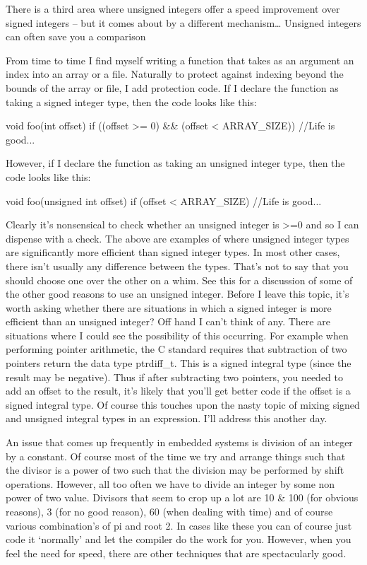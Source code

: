 {{{{{{{{{{There is a third area where unsigned integers offer a speed improvement over signed integers – but it comes about by a different mechanism…
Unsigned integers can often save you a comparison

From time to time I find myself writing a function that takes as an argument an index into an array or a file. Naturally to protect against indexing beyond the bounds of the array or file, I add protection code. If I declare the function as taking a signed integer type, then the code looks like this:

void foo(int offset)
{
 if ((offset >= 0) && (offset < ARRAY_SIZE))
 {
  //Life is good...
 }
}

However, if I declare the function as taking an unsigned integer type, then the code looks like this:

void foo(unsigned int offset)
{
 if (offset < ARRAY_SIZE)
 {
  //Life is good...
 }
}

Clearly it’s nonsensical to check whether an unsigned integer is >=0 and so I can dispense with a check. The above are examples of where unsigned integer types are significantly more efficient than signed integer types. In most other cases, there isn’t usually any difference between the types. That’s not to say that you should choose one over the other on a whim. See this for a discussion of some of the other good reasons to use an unsigned integer. Before I leave this topic, it’s worth asking whether there are situations in which a signed integer is more efficient than an unsigned integer? Off hand I can’t think of any. There are situations where I could see the possibility of this occurring. For example when performing pointer arithmetic, the C standard requires that subtraction of two pointers return the data type ptrdiff_t. This is a signed integral type (since the result may be negative). Thus if after subtracting two pointers, you needed to add an offset to the result, it’s likely that you’ll get better code if the offset is a signed integral type. Of course this touches upon the nasty topic of mixing signed and unsigned integral types in an expression. I’ll address this another day.



An issue that comes up frequently in embedded systems is division of an integer by a constant. Of course most of the time we try and arrange things such that the divisor is a power of two such that the division may be performed by shift operations. However, all too often we have to divide an integer by some non power of two value. Divisors that seem to crop up a lot are 10 & 100 (for obvious reasons), 3 (for no good reason), 60 (when dealing with time) and of course various combination’s of pi and root 2. In cases like these you can of course just code it ‘normally’ and let the compiler do the work for you. However, when you feel the need for speed, there are other techniques that are spectacularly good.

}}}}}}}}}}
